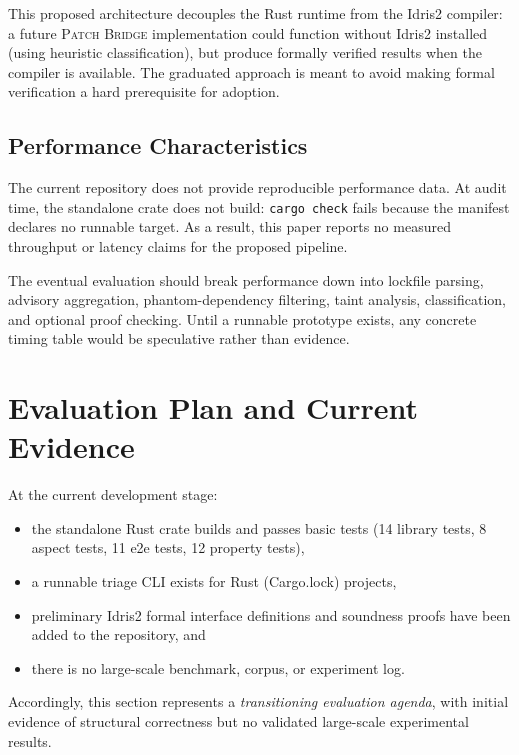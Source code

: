 \documentclass[11pt,twocolumn]{article}
\begin{document}
This proposed architecture decouples the Rust runtime from the Idris2
compiler: a future \textsc{Patch Bridge} implementation could function
without Idris2 installed (using heuristic classification), but produce
formally verified results when the compiler is available. The graduated
approach is meant to avoid making formal verification a hard
prerequisite for adoption.

\subsection{Performance Characteristics}

The current repository does not provide reproducible performance data.
At audit time, the standalone crate does not build: \texttt{cargo check}
fails because the manifest declares no runnable target. As a result, this
paper reports no measured throughput or latency claims for the proposed
pipeline.

The eventual evaluation should break performance down into lockfile
parsing, advisory aggregation, phantom-dependency filtering, taint
analysis, classification, and optional proof checking. Until a runnable
prototype exists, any concrete timing table would be speculative rather
than evidence.

\section{Evaluation Plan and Current Evidence}
\label{sec:evaluation}

At the current development stage:

\begin{itemize}[nosep]
  \item the standalone Rust crate builds and passes basic tests (14
    library tests, 8 aspect tests, 11 e2e tests, 12 property tests),
  \item a runnable triage CLI exists for Rust (Cargo.lock) projects,
  \item preliminary Idris2 formal interface definitions and soundness
    proofs have been added to the repository, and
  \item there is no large-scale benchmark, corpus, or experiment log.
\end{itemize}

Accordingly, this section represents a \emph{transitioning evaluation
agenda}, with initial evidence of structural correctness but no
validated large-scale experimental results.
\end{document}
